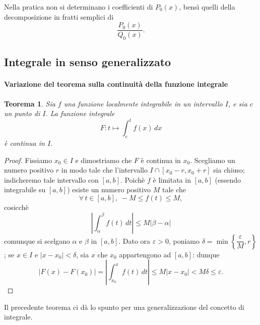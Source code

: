 \documentclass{article}
\theoremstyle{plain}
\newtheorem{thm}{Teorema}[section]
\theoremstyle{definition}
\theoremstyle{remark}
\begin{document}
\vspace{10pt}

Nella pratica non si determinano i coefficienti di $P_0(x)$, bensì quelli della decomposizione in fratti semplici di \[\dfrac{P_0(x)}{Q_0(x)}.\]

\vspace{10pt}

\subsection{Integrale in senso generalizzato}

\vspace{10pt}

\paragraph{Variazione del teorema sulla continuità della funzione integrale}
\begin{bxthm}
\begin{thm}
    Sia $f$ una funzione localmente integrabile in un intervallo $I$, e sia $c$ un punto di $I$. 
    La funzione integrale 
    \[F:t\mapsto \int_{c}^{t}f(x)\,dx\] è continua in $I$.
\end{thm}
\end{bxthm}
\begin{proof}
    Fissiamo $x_0\in I$ e dimostriamo che $F$ è continua in $x_0$.
    Scegliamo un numero positivo $r$ in modo tale che l'intervallo $I\cap[x_0-r,x_0+r]$ sia chiuso; 
    indicheremo tale intervallo con $[a,b]$. Poichè $f$ è limitata in $[a,b]$ (essendo integrabile su $[a,b]$) esiste un numero positivo $M$ tale che 
    \[\forall\,t\in[a,b],\;-M\leq f(t)\leq M,\]
    cosicchè 
    \[\left|\int_{\alpha}^{\beta}f(t)\,dt\right|\leq M|\beta-\alpha|\]
    comunque si scelgano $\alpha$ e $\beta$ in $[a,b]$.
    Dato ora $\varepsilon>0$, poniamo $\delta=\min\left\{\dfrac{\varepsilon}{M},r\right\}$; se $x\in I$ e $|x-x_0|<\delta$, sia $x$ che $x_0$ appartengono ad $[a,b]$: dunque
    \[|F(x)-F(x_0)|=\left|\int_{x_0}^{x}f(t)\,dt\right|\leq M|x-x_0|<M\delta\leq\varepsilon.\]
\end{proof}

\vspace{10pt}

Il precedente teorema ci dà lo spunto per una generalizzazione del concetto di integrale.

\vspace{10pt}
\end{document}
